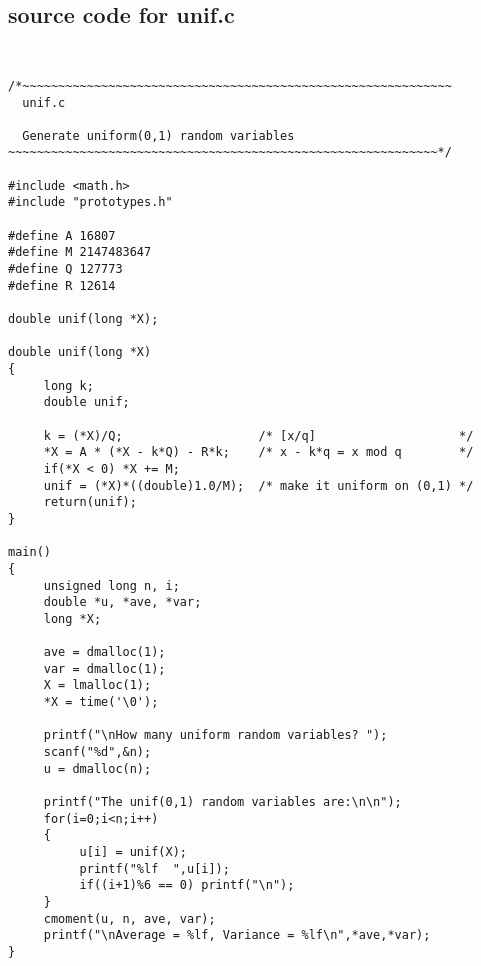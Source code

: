 \documentclass{article}
\begin{document}
\subsection{source code for unif.c}
\label{sec:unif}
{\tt
\begin{verbatim}
/*~~~~~~~~~~~~~~~~~~~~~~~~~~~~~~~~~~~~~~~~~~~~~~~~~~~~~~~~~~~~
  unif.c

  Generate uniform(0,1) random variables
~~~~~~~~~~~~~~~~~~~~~~~~~~~~~~~~~~~~~~~~~~~~~~~~~~~~~~~~~~~~*/

#include <math.h>
#include "prototypes.h"

#define A 16807 
#define M 2147483647 
#define Q 127773
#define R 12614

double unif(long *X);

double unif(long *X)
{
     long k;
     double unif;

     k = (*X)/Q;                   /* [x/q]                    */
     *X = A * (*X - k*Q) - R*k;    /* x - k*q = x mod q        */
     if(*X < 0) *X += M;
     unif = (*X)*((double)1.0/M);  /* make it uniform on (0,1) */
     return(unif);
}

main()
{
     unsigned long n, i;
     double *u, *ave, *var;
     long *X;

     ave = dmalloc(1);
     var = dmalloc(1);
     X = lmalloc(1);
     *X = time('\0');

     printf("\nHow many uniform random variables? ");
     scanf("%d",&n);
     u = dmalloc(n);

     printf("The unif(0,1) random variables are:\n\n");
     for(i=0;i<n;i++)
     { 
          u[i] = unif(X);
          printf("%lf  ",u[i]);
          if((i+1)%6 == 0) printf("\n");
     }
     cmoment(u, n, ave, var);
     printf("\nAverage = %lf, Variance = %lf\n",*ave,*var);
}
\end{verbatim}
}
\end{document}
